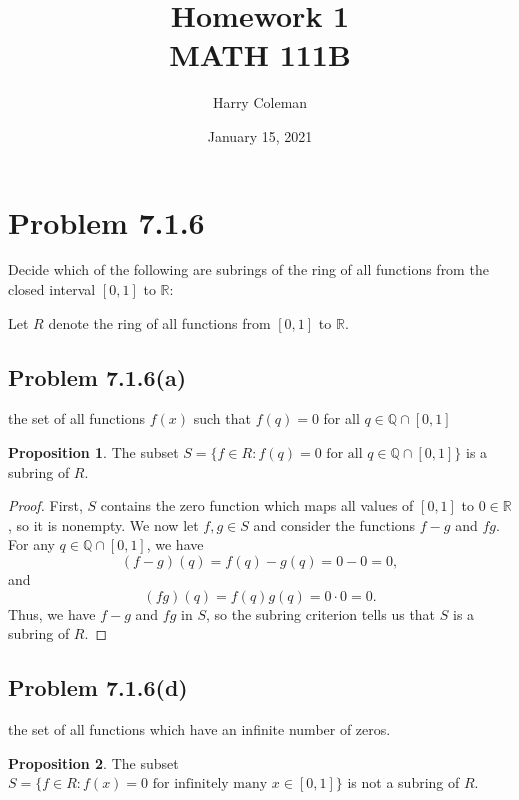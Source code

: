 \documentclass[12pt]{article}
\title{Homework 1\\
    \large MATH 111B
}
\author{Harry Coleman}
\date{January 15, 2021}
\newenvironment{problem}
    {\begin{lrbox}{\mybox}\begin{minipage}{0.98\textwidth}}
    {\end{minipage}\end{lrbox}\begin{center}\framebox[\textwidth]{\usebox{\mybox}}\end{center}}
\theoremstyle{definition}
\newtheorem{proposition}{Proposition}
\newcommand{\Q}{\mathbb{Q}}
\newcommand{\R}{\mathbb{R}}
\begin{document}
\maketitle

\section{Problem 7.1.6}
\begin{problem}
    Decide which of the following are subrings of the ring of all functions from the closed interval $[0, 1]$ to $\R$:
\end{problem}

Let $R$ denote the ring of all functions from $[0,1]$ to $\R$.

\subsection{Problem 7.1.6(a)}
\begin{problem}
    the set of all functions $f(x)$ such that $f(q) = 0$ for all $q \in \Q \cap [0, 1]$
\end{problem}

\begin{proposition}
    The subset $S = \{f \in R : f(q) = 0 \text{ for all } q \in \Q \cap [0, 1]\}$ is a subring of $R$.
\end{proposition}

\begin{proof}
    First, $S$ contains the zero function which maps all values of $[0, 1]$ to $0 \in \R$, so it is nonempty. We now let $f, g \in S$ and consider the functions $f - g$ and $fg$. For any $q \in \Q \cap [0, 1]$, we have
    \[
        (f - g)(q) = f(q) - g(q) = 0 - 0 = 0,
    \]
    and
    \[
        (fg)(q) = f(q)g(q) = 0 \cdot 0 = 0.
    \]
    Thus, we have $f - g$ and $fg$ in $S$, so the subring criterion tells us that $S$ is a subring of $R$.
    
\end{proof}

\newpage
\subsection{Problem 7.1.6(d)}
\begin{problem}
    the set of all functions which have an infinite number of zeros.
\end{problem}

\begin{proposition}
    The subset $S = \{f \in R : f(x) = 0 \text{ for infinitely many } x \in [0, 1]\}$ is not a subring of $R$.
\end{proposition}
\end{document}
